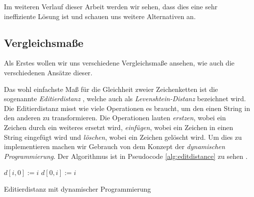 \documentclass[sigconf]{acmart}
\DeclarePairedDelimiter\abs{\lvert}{\rvert}
\begin{document}
Im weiteren Verlauf dieser Arbeit werden wir sehen, dass dies eine sehr
ineffiziente Lösung ist und schauen uns weitere Alternativen an.


\subsection*{Vergleichsmaße}
Als Erstes wollen wir uns verschiedene Vergleichsmaße ansehen, wie auch
die verschiedenen Ansätze dieser.

Das wohl einfachste Maß für die Gleichheit zweier Zeichenketten
ist die sogenannte \emph{Editierdistanz} \cite[Vgl. S. 2] {cohen2003comparison}, welche auch als
\emph{Levenshtein-Distanz} bezeichnet wird. Die Editierdistanz
misst wie viele Operationen es braucht, um den einen String in den
anderen zu transformieren. Die Operationen lauten \emph{erstzen}, wobei
ein Zeichen durch ein weiteres ersetzt wird, \emph{einfügen}, wobei ein
Zeichen in einen String eingefügt wird und \emph{löschen}, wobei ein
Zeichen gelöscht wird. Um dies zu implementieren machen wir Gebrauch
von dem Konzept der \emph{dynamischen Programmierung}. Der Algorithmus ist
in Pseudocode \ref{alg:editdistance} zu sehen \cite[Vgl. S. 223] {bille2005survey}.

  \begin{algorithm}
    \begin{algorithmic}[1]
      
        \State $d[i,0] := i$
      \EndFor
        \State $d[0,i] := i$
      \EndFor

          \Else
          \EndIf
          \State {}
        \EndFor
      \EndFor
    
      \EndProcedure
      
    \end{algorithmic}
    \caption{Editierdistanz mit dynamischer Programmierung}
    \label{alg:editdistance}
    \end{algorithm}
\end{document}
